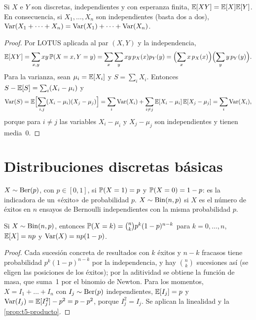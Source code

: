 \begin{proposicion}\label{prop:t5-producto}
Si $X$ e $Y$ son discretas, independientes y con esperanza finita, $\mathbb{E}[XY]=\mathbb{E}[X]\mathbb{E}[Y]$. En consecuencia, si $X_1,\dots,X_n$ son independientes (basta dos a dos), $\operatorname{Var}(X_1+\dots+X_n)=\operatorname{Var}(X_1)+\dots+\operatorname{Var}(X_n)$.
\end{proposicion}

\begin{proof}
Por LOTUS aplicada al par $(X,Y)$ y la independencia,
\[
\mathbb{E}[XY]=\sum_{x,y}xy\,\mathbb{P}(X=x,Y=y)=\sum_x\sum_yxy\,p_X(x)p_Y(y)=\Bigl(\sum_xx\,p_X(x)\Bigr)\Bigl(\sum_yy\,p_Y(y)\Bigr).
\]
Para la varianza, sean $\mu_i=\mathbb{E}[X_i]$ y $S=\sum_iX_i$. Entonces $S-\mathbb{E}[S]=\sum_i(X_i-\mu_i)$ y
\[
\operatorname{Var}(S)=\mathbb{E}\Bigl[\sum_{i,j}(X_i-\mu_i)(X_j-\mu_j)\Bigr]=\sum_i\operatorname{Var}(X_i)+\sum_{i\neq j}\mathbb{E}[X_i-\mu_i]\,\mathbb{E}[X_j-\mu_j]=\sum_i\operatorname{Var}(X_i),
\]
porque para $i\neq j$ las variables $X_i-\mu_i$ y $X_j-\mu_j$ son independientes y tienen media~0.
\end{proof}

\section{Distribuciones discretas básicas}

\begin{definicion}
$X\sim\operatorname{Ber}(p)$, con $p\in[0,1]$, si $\mathbb{P}(X=1)=p$ y $\mathbb{P}(X=0)=1-p$: es la indicadora de un «éxito» de probabilidad $p$. $X\sim\operatorname{Bin}(n,p)$ si $X$ es el número de éxitos en $n$ ensayos de Bernoulli independientes con la misma probabilidad $p$.
\end{definicion}

\begin{teorema}\label{teo:t5-binomial}
Si $X\sim\operatorname{Bin}(n,p)$, entonces $\mathbb{P}(X=k)=\binom nk p^{k}(1-p)^{n-k}$ para $k=0,\dots,n$, $\mathbb{E}[X]=np$ y $\operatorname{Var}(X)=np(1-p)$.
\end{teorema}

\begin{proof}
Cada sucesión concreta de resultados con $k$ éxitos y $n-k$ fracasos tiene probabilidad $p^{k}(1-p)^{n-k}$ por la independencia, y hay $\binom nk$ sucesiones así (se eligen las posiciones de los éxitos); por la aditividad se obtiene la función de masa, que suma~1 por el binomio de Newton. Para los momentos, $X=I_1+\dots+I_n$ con $I_j\sim\operatorname{Ber}(p)$ independientes, $\mathbb{E}[I_j]=p$ y $\operatorname{Var}(I_j)=\mathbb{E}[I_j^{2}]-p^{2}=p-p^{2}$, porque $I_j^{2}=I_j$. Se aplican la linealidad y la \cref{prop:t5-producto}.
\end{proof}


